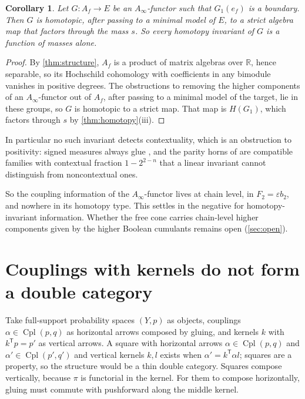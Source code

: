 \documentclass[11pt]{article}
\newtheorem{corollary}[theorem]{Corollary}
\theoremstyle{definition}
\theoremstyle{remark}
\newcommand{\R}{\mathbb{R}}
\newcommand{\Cpl}{\operatorname{Cpl}}
\newcommand{\T}{\mathsf T}
\begin{document}
\begin{corollary}\label{cor:blind}
Let $G\colon A_f\to E$ be an $A_\infty$-functor such that $G_1(e_f)$ is a boundary. Then $G$ is homotopic, after passing to a
minimal model of $E$, to a strict algebra map that factors through the mass $s$. So every homotopy invariant of $G$ is a
function of masses alone.
\end{corollary}
\begin{proof}
By \cref{thm:structure}, $A_f$ is a product of matrix algebras over $\R$, hence separable, so its Hochschild cohomology with
coefficients in any bimodule vanishes in positive degrees. The obstructions to removing the higher components of an
$A_\infty$-functor out of $A_f$, after passing to a minimal model of the target, lie in these groups, so $G$ is homotopic to a
strict map. That map is $H(G_1)$, which factors through $s$ by \cref{thm:homotopy}(iii).
\end{proof}

In particular no such invariant detects contextuality, which is an obstruction to positivity: signed measures always glue
\cite[Prop.~35.1]{ThreeLayers}, and the parity horns of \cite[Thm.~4.3]{Conditionals} are compatible families with contextual
fraction $1-2^{2-n}$ that a linear invariant cannot distinguish from noncontextual ones.

So the coupling information of the $A_\infty$-functor lives at chain level, in $F_2=\varepsilon b_2$, and nowhere in its homotopy
type. This settles \cite[Question~9.4(i)]{Conditionals} in the negative for homotopy-invariant information. Whether the free
cone carries chain-level higher components given by the higher Boolean cumulants remains open (\cref{sec:open}).

\section{Couplings with kernels do not form a double category}\label{sec:double}

Take full-support probability spaces $(Y,p)$ as objects, couplings $\alpha\in\Cpl(p,q)$ as horizontal arrows composed by gluing, and
kernels $k$ with $k^\T p=p'$ as vertical arrows. A square with horizontal arrows $\alpha\in\Cpl(p,q)$ and $\alpha'\in\Cpl(p',q')$ and
vertical kernels $k,l$ exists when $\alpha'=k^\T\alpha l$; squares are a property, so the structure would be a thin double category.
Squares compose vertically, because $\pi$ is functorial in the kernel. For them to compose horizontally, gluing must commute
with pushforward along the middle kernel.
\end{document}
